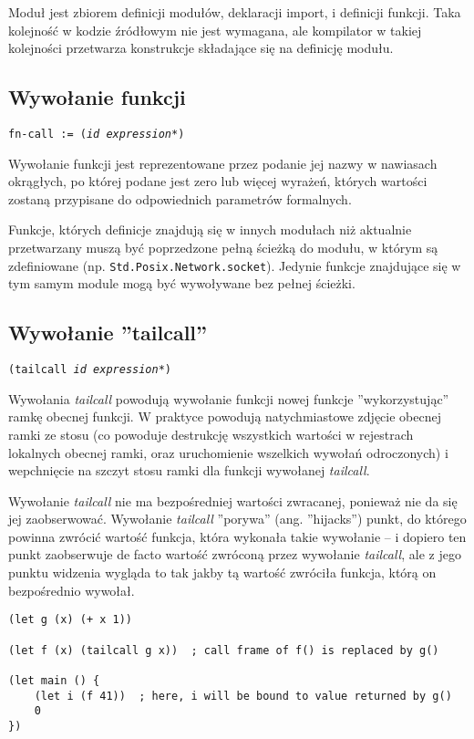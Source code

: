 Moduł jest zbiorem definicji modułów, deklaracji import, i definicji funkcji.
Taka kolejność w kodzie źródłowym nie jest wymagana, ale kompilator w takiej kolejności przetwarza konstrukcje
składające się na definicję modułu.

\subsection{Wywołanie funkcji}

\texttt{fn-call := (\emph{id} \emph{expression}*)}
\newline

Wywołanie funkcji jest reprezentowane przez podanie jej nazwy w nawiasach okrągłych, po której podane jest
zero lub więcej wyrażeń, których wartości zostaną przypisane do odpowiednich parametrów formalnych.

Funkcje, których definicje znajdują się w innych modułach niż aktualnie przetwarzany muszą być poprzedzone
pełną ścieżką do modułu, w którym są zdefiniowane (np. \texttt{Std.Posix.Network.socket}). Jedynie funkcje
znajdujące się w tym samym module mogą być wywoływane bez pełnej ścieżki.

\subsection{Wywołanie ''tailcall''}

\texttt{(tailcall \emph{id} \emph{expression}*)}
\newline

Wywołania \emph{tailcall} powodują wywołanie funkcji nowej funkcje ''wykorzystując'' ramkę obecnej funkcji.
W praktyce powodują natychmiastowe zdjęcie obecnej ramki ze stosu (co powoduje destrukcję wszystkich wartości
w rejestrach lokalnych obecnej ramki, oraz uruchomienie wszelkich wywołań odroczonych) i wepchnięcie na szczyt
stosu ramki dla funkcji wywołanej \emph{tailcall}.

Wywołanie \emph{tailcall} nie ma bezpośredniej wartości zwracanej, ponieważ nie da się jej zaobserwować.
Wywołanie \emph{tailcall} ''porywa'' (ang. ''hijacks'') punkt, do którego powinna zwrócić wartość funkcja,
która wykonała takie wywołanie -- i dopiero ten punkt zaobserwuje de facto wartość zwróconą przez wywołanie
\emph{tailcall}, ale z jego punktu widzenia wygląda to tak jakby tą wartość zwróciła funkcja, którą on
bezpośrednio wywołał.

\begin{lstlisting}
(let g (x) (+ x 1))

(let f (x) (tailcall g x))  ; call frame of f() is replaced by g()

(let main () {
    (let i (f 41))  ; here, i will be bound to value returned by g()
    0
})
\end{lstlisting}

